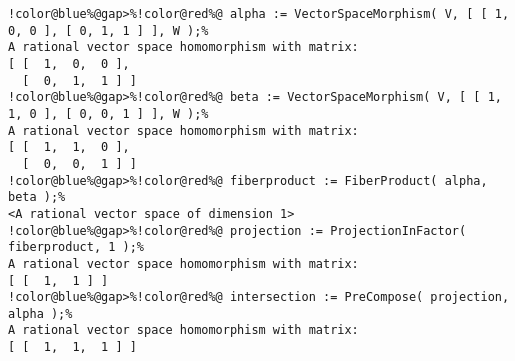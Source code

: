 \begin{Verbatim}[commandchars=!@\%,frame=single]
!color@blue%@gap>%!color@red%@ alpha := VectorSpaceMorphism( V, [ [ 1, 0, 0 ], [ 0, 1, 1 ] ], W );%
A rational vector space homomorphism with matrix: 
[ [  1,  0,  0 ],
  [  0,  1,  1 ] ]
!color@blue%@gap>%!color@red%@ beta := VectorSpaceMorphism( V, [ [ 1, 1, 0 ], [ 0, 0, 1 ] ], W );%
A rational vector space homomorphism with matrix: 
[ [  1,  1,  0 ],
  [  0,  0,  1 ] ]
!color@blue%@gap>%!color@red%@ fiberproduct := FiberProduct( alpha, beta );%
<A rational vector space of dimension 1>
!color@blue%@gap>%!color@red%@ projection := ProjectionInFactor( fiberproduct, 1 );%
A rational vector space homomorphism with matrix: 
[ [  1,  1 ] ]
!color@blue%@gap>%!color@red%@ intersection := PreCompose( projection, alpha );%
A rational vector space homomorphism with matrix: 
[ [  1,  1,  1 ] ]
\end{Verbatim}

